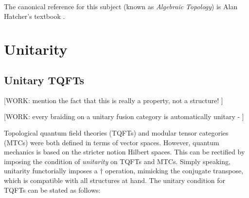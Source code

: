 \documentclass{article}
\theoremstyle{definition}
\numberwithin{figure}{section}
\begin{document}
The canonical reference for this subject (known as \textit{Algebraic Topology}) is Alan Hatcher's textbook \cite{hatcher2005algebraic}.

\section{Unitarity}
\label{Unitarity}

\subsection{Unitary TQFTs}

[WORK: mention the fact that this is really a property, not a structure! \cite{reutter2023uniqueness}]

[WORK: every braiding on a unitary fusion category is automatically unitary - \cite{galindo2014braided}]

Topological quantum field theories (TQFTs) and modular tensor categories (MTCs) were both defined in terms of vector spaces. However, quantum mechanics is based on the stricter notion Hilbert spaces. This can be rectified by imposing the condition of \textit{unitarity} on TQFTs and MTCs. Simply speaking, unitarity functorially imposes a $\dagger$ operation, mimicking the conjugate transpose, which is compatible with all structures at hand. The unitary condition for TQFTs can be stated as follows:
\end{document}
